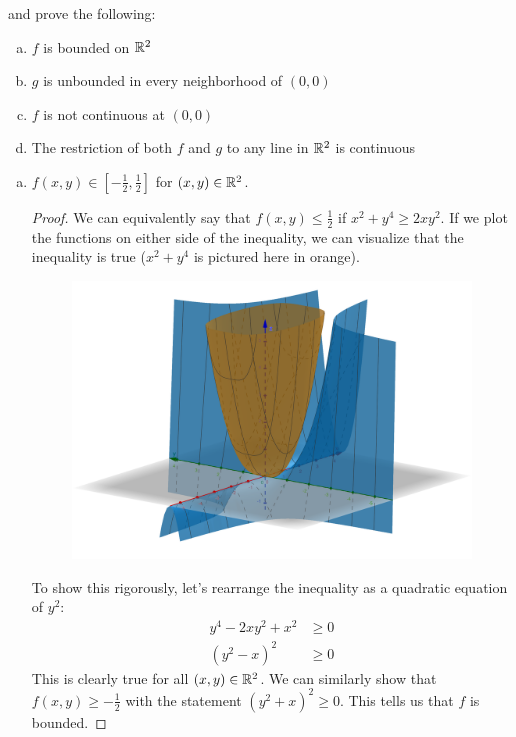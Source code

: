 \documentclass{article}
\begin{document}
\begin{enumerate}
and prove the following:
\begin{enumerate}[a.]
\item $f$ is bounded on $\mathbb{R}^2$
\item $g$ is unbounded in every neighborhood of $(0, 0)$
\item $f$ is not continuous at $(0, 0)$
\item The restriction of both $f$ and $g$ to any line in $\mathbb{R}^2$ is continuous
\end{enumerate}

\qquad

\begin{enumerate}[a.]
\newcommand{\Boundary}{\frac{1}{2}}

\item \claim $f(x, y) \in [-\Boundary, \Boundary]$
      for $(x, y) \in \mathbb{R}^2$.
\begin{proof}
We can equivalently say that $f(x,y) \leq \Boundary$ if $x^2 + y^4 \geq 2xy^2$.
If we plot the functions on either side of the inequality, we can visualize
that the inequality is true ($x^2 + y^4$ is pictured here in orange).

\begin{figure}[h]
\includegraphics[scale=0.1]{figure-04-07-a}
\centering
\end{figure}

To show this rigorously, let's rearrange the inequality as a quadratic equation
of $y^2$:
\begin{equation*}
\begin{split}
y^4 - 2xy^2 + x^2 &\geq 0 \\
      (y^2 - x)^2 &\geq 0
\end{split}
\end{equation*}
This is clearly true for all $(x, y) \in \mathbb{R}^2$. We can similarly show that
$f(x, y) \geq -\Boundary$ with the statement $(y^2 + x)^2 \geq 0$. This tells
us that $f$ is bounded.

\end{proof}

\end{enumerate}
        
\end{enumerate}
\end{document}
